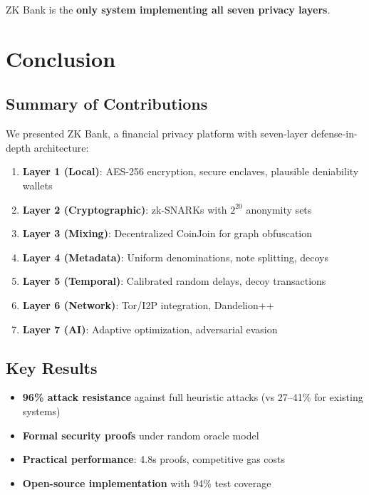 \documentclass[11pt]{article}
\theoremstyle{definition}
\theoremstyle{plain}
\theoremstyle{remark}
\begin{document}
ZK Bank is the \textbf{only system implementing all seven privacy layers}.

\section{Conclusion}
\label{sec:conclusion}

\subsection{Summary of Contributions}

We presented ZK Bank, a financial privacy platform with seven-layer defense-in-depth architecture:

\begin{enumerate}
    \item \textbf{Layer 1 (Local)}: AES-256 encryption, secure enclaves, plausible deniability wallets
    \item \textbf{Layer 2 (Cryptographic)}: zk-SNARKs with $2^{20}$ anonymity sets
    \item \textbf{Layer 3 (Mixing)}: Decentralized CoinJoin for graph obfuscation
    \item \textbf{Layer 4 (Metadata)}: Uniform denominations, note splitting, decoys
    \item \textbf{Layer 5 (Temporal)}: Calibrated random delays, decoy transactions
    \item \textbf{Layer 6 (Network)}: Tor/I2P integration, Dandelion++
    \item \textbf{Layer 7 (AI)}: Adaptive optimization, adversarial evasion
\end{enumerate}

\subsection{Key Results}

\begin{itemize}
    \item \textbf{96\% attack resistance} against full heuristic attacks (vs 27--41\% for existing systems)
    \item \textbf{Formal security proofs} under random oracle model
    \item \textbf{Practical performance}: 4.8s proofs, competitive gas costs
    \item \textbf{Open-source implementation} with 94\% test coverage
\end{itemize}
\end{document}

